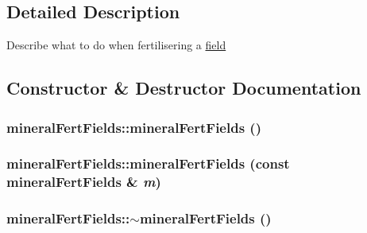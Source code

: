 \subsection{Detailed Description}
Describe what to do when fertilisering a \hyperlink{classfield}{field} 

\subsection{Constructor \& Destructor Documentation}
\hypertarget{classmineral_fert_fields_ab9398eaffbf41879b66ec028d442e617}{
\subsubsection[{mineralFertFields}]{\setlength{\rightskip}{0pt plus 5cm}mineralFertFields::mineralFertFields ()}}
\label{classmineral_fert_fields_ab9398eaffbf41879b66ec028d442e617}
\hypertarget{classmineral_fert_fields_ae199e71e7532a348e6c251a94104e7ee}{
\subsubsection[{mineralFertFields}]{\setlength{\rightskip}{0pt plus 5cm}mineralFertFields::mineralFertFields (const {\bf mineralFertFields} \& {\em m})}}
\label{classmineral_fert_fields_ae199e71e7532a348e6c251a94104e7ee}
\hypertarget{classmineral_fert_fields_ab9828f2f16f5a2bd870beeaa2a0a57a0}{
\subsubsection[{$\sim$mineralFertFields}]{\setlength{\rightskip}{0pt plus 5cm}mineralFertFields::$\sim$mineralFertFields ()}}
\label{classmineral_fert_fields_ab9828f2f16f5a2bd870beeaa2a0a57a0}


